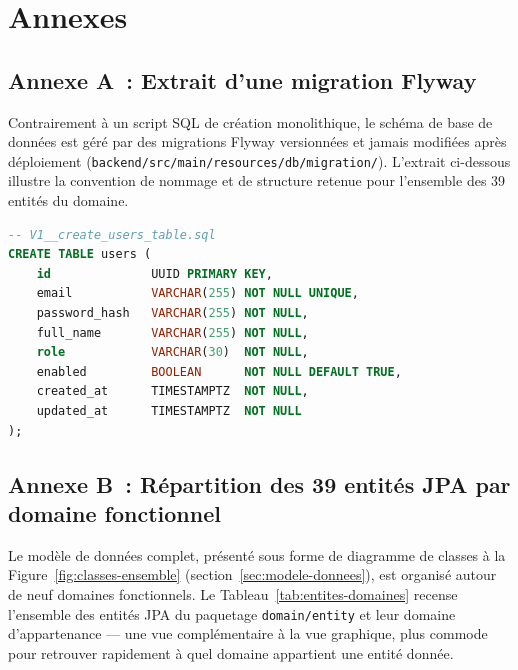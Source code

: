\documentclass[12pt,a4paper,oneside]{report}
\begin{document}
\chapter{Annexes}

\section{Annexe A~: Extrait d'une migration Flyway}

Contrairement à un script SQL de création monolithique, le schéma de base
de données est géré par des migrations Flyway versionnées et jamais
modifiées après déploiement (\texttt{backend/src/main/resources/db/migration/}).
L'extrait ci-dessous illustre la convention de nommage et de structure
retenue pour l'ensemble des 39 entités du domaine.

\begin{lstlisting}[language=SQL,caption={Convention de migration Flyway (exemple simplifié)},label=lst:flyway]
-- V1__create_users_table.sql
CREATE TABLE users (
    id              UUID PRIMARY KEY,
    email           VARCHAR(255) NOT NULL UNIQUE,
    password_hash   VARCHAR(255) NOT NULL,
    full_name       VARCHAR(255) NOT NULL,
    role            VARCHAR(30)  NOT NULL,
    enabled         BOOLEAN      NOT NULL DEFAULT TRUE,
    created_at      TIMESTAMPTZ  NOT NULL,
    updated_at      TIMESTAMPTZ  NOT NULL
);
\end{lstlisting}

\section{Annexe B~: Répartition des 39 entités JPA par domaine fonctionnel}

Le modèle de données complet, présenté sous forme de diagramme de classes
à la Figure~\ref{fig:classes-ensemble} (section~\ref{sec:modele-donnees}),
est organisé autour de neuf domaines fonctionnels. Le
Tableau~\ref{tab:entites-domaines} recense l'ensemble des entités JPA du
paquetage \texttt{domain/entity} et leur domaine d'appartenance --- une
vue complémentaire à la vue graphique, plus commode pour retrouver
rapidement à quel domaine appartient une entité donnée.
\end{document}
